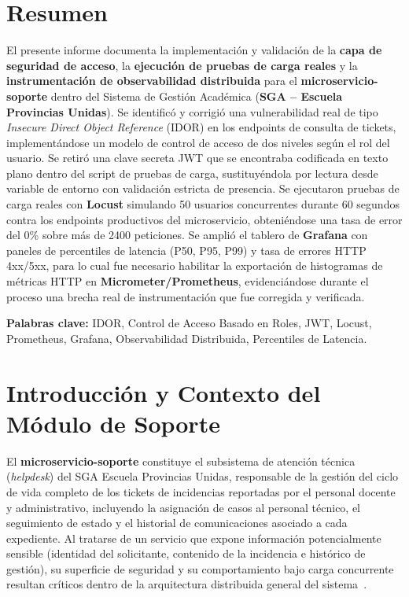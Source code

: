 ﻿\documentclass[11pt,a4paper]{article}
\begin{document}
\section*{Resumen}
El presente informe documenta la implementaci\'on y validaci\'on de la \textbf{capa de seguridad de acceso}, la \textbf{ejecuci\'on de pruebas de carga reales} y la \textbf{instrumentaci\'on de observabilidad distribuida} para el \textbf{microservicio-soporte} dentro del Sistema de Gesti\'on Acad\'emica (\textbf{SGA -- Escuela Provincias Unidas}). Se identific\'o y corrigi\'o una vulnerabilidad real de tipo \textit{Insecure Direct Object Reference} (IDOR) en los endpoints de consulta de tickets, implement\'andose un modelo de control de acceso de dos niveles seg\'un el rol del usuario. Se retir\'o una clave secreta JWT que se encontraba codificada en texto plano dentro del script de pruebas de carga, sustituy\'endola por lectura desde variable de entorno con validaci\'on estricta de presencia. Se ejecutaron pruebas de carga reales con \textbf{Locust} simulando 50 usuarios concurrentes durante 60 segundos contra los endpoints productivos del microservicio, obteni\'endose una tasa de error del 0\% sobre m\'as de 2400 peticiones. Se ampli\'o el tablero de \textbf{Grafana} con paneles de percentiles de latencia (P50, P95, P99) y tasa de errores HTTP 4xx/5xx, para lo cual fue necesario habilitar la exportaci\'on de histogramas de m\'etricas HTTP en \textbf{Micrometer/Prometheus}, evidenci\'andose durante el proceso una brecha real de instrumentaci\'on que fue corregida y verificada.

\medskip
\noindent\textbf{Palabras clave:} IDOR, Control de Acceso Basado en Roles, JWT, Locust, Prometheus, Grafana, Observabilidad Distribuida, Percentiles de Latencia.

\vspace{0.4cm}

\section{Introducci\'on y Contexto del M\'odulo de Soporte}
El \textbf{microservicio-soporte} constituye el subsistema de atenci\'on t\'ecnica (\textit{helpdesk}) del SGA Escuela Provincias Unidas, responsable de la gesti\'on del ciclo de vida completo de los tickets de incidencias reportadas por el personal docente y administrativo, incluyendo la asignaci\'on de casos al personal t\'ecnico, el seguimiento de estado y el historial de comunicaciones asociado a cada expediente. Al tratarse de un servicio que expone informaci\'on potencialmente sensible (identidad del solicitante, contenido de la incidencia e hist\'orico de gesti\'on), su superficie de seguridad y su comportamiento bajo carga concurrente resultan cr\'iticos dentro de la arquitectura distribuida general del sistema~\cite{newman2021microservices}.
\end{document}
